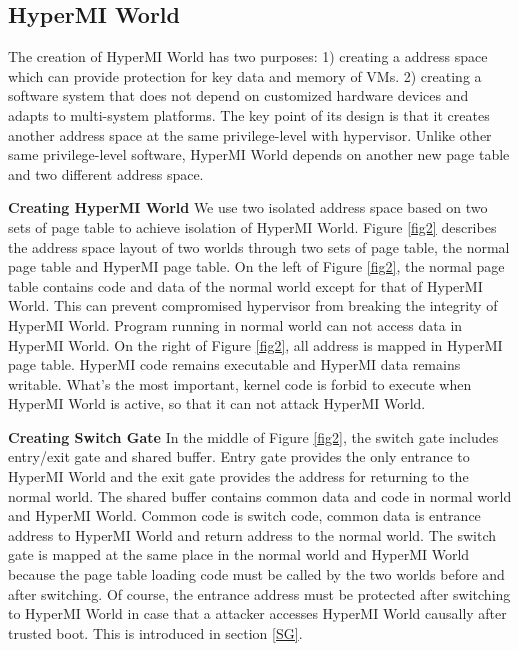 \documentclass[conference]{IEEEtran}
\begin{document}
\subsection{HyperMI World} \label {HWorld}

The creation of HyperMI World has two purposes: 1) creating a address space which can provide protection for key data and memory of VMs. 2) creating a software system that does not depend on customized hardware devices and adapts to multi-system platforms. The key point of its design is that it creates another address space at the same privilege-level with hypervisor. Unlike other same privilege-level software, HyperMI World depends on another new page table and two different address space.

\textbf{Creating HyperMI World}
 We use two isolated address space based on two sets of page table to achieve isolation of HyperMI World.
Figure \ref{fig2} describes the address space layout of two worlds through two sets of page table, the normal page table and HyperMI page table. On the left of Figure \ref{fig2}, the normal page table contains code and data of the normal world except for that of HyperMI World. This can prevent compromised hypervisor from breaking the integrity of HyperMI World. Program running in normal world can not access data in HyperMI World. On the right of Figure \ref{fig2}, all address is mapped in HyperMI page table.
HyperMI code remains executable and HyperMI data remains writable. What's the most important, kernel code is forbid to execute when HyperMI World is active, so that it can not attack HyperMI World.

\textbf{Creating Switch Gate}
In the middle of Figure \ref{fig2}, the switch gate includes entry/exit gate and shared buffer. Entry gate provides the only entrance to HyperMI World and the exit gate provides the address for returning to the normal world. The shared buffer contains common data and code in normal world and HyperMI World. Common code is switch code, common data is entrance address to HyperMI World and return address to the normal world. The switch gate is mapped at the same place in the normal world and HyperMI World because the page table loading code must be called by the two worlds before and after switching. Of course, the entrance address must be protected after switching to HyperMI World in case that a attacker accesses HyperMI World causally after trusted boot. This is introduced in section \ref{SG}.
\end{document}
